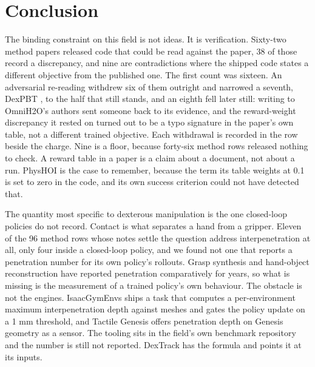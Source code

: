 \section{Conclusion}
\label{sec:conclusion}

The binding constraint on this field is not ideas. It is verification. Sixty-two method papers
released code that could be read against the paper, 38 of those record a discrepancy, and nine are
contradictions where the shipped code states a different objective from the published one. The
first count was sixteen. An adversarial re-reading withdrew six of them outright and narrowed a
seventh, DexPBT \cite{dexpbt_2023}, to the half that still stands, and an eighth fell later still:
writing to OmniH2O's \cite{omnih2o_2024} authors sent someone back to its evidence, and the
reward-weight discrepancy it rested on turned out to be a typo signature in the paper's own table,
not a different trained objective. Each withdrawal is recorded in the row beside the charge. Nine
is a floor, because forty-six method rows released nothing to check. A reward table in a paper is
a claim about a document, not about a run. PhysHOI \cite{physhoi_2023} is the case to remember,
because the term its table weights at 0.1 is set to zero in the code, and its own success
criterion could not have detected that.

The quantity most specific to dexterous manipulation is the one closed-loop policies do not
record. Contact is what separates a hand from a gripper. Eleven of the 96 method rows whose notes
settle the question address interpenetration at all, only four inside a closed-loop policy, and we
found not one that reports a penetration number for its own policy's rollouts. Grasp synthesis and
hand-object reconstruction have reported penetration comparatively for years, so what is missing
is the measurement of a trained policy's own behaviour. The obstacle is not the engines.
IsaacGymEnvs ships a task that computes a per-environment maximum interpenetration depth against
meshes and gates the policy update on a 1 mm threshold, and Tactile Genesis
\cite{tactile_genesis_2026} offers penetration depth on Genesis geometry as a sensor. The tooling
sits in the field's own benchmark repository and the number is still not reported. DexTrack
\cite{dextrack_2025} has the formula and points it at its inputs.

